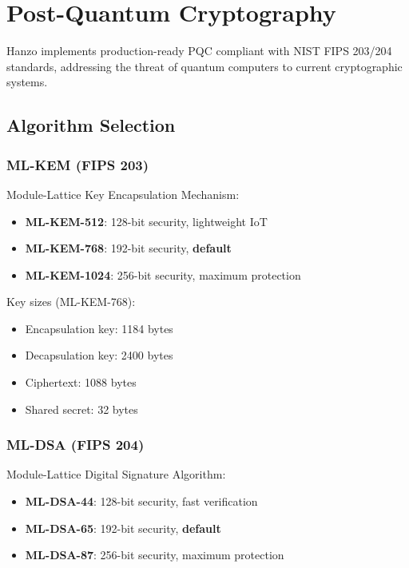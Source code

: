 \section{Post-Quantum Cryptography}


Hanzo implements production-ready PQC compliant with NIST FIPS 203/204 standards, addressing the threat of quantum computers to current cryptographic systems.

\subsection{Algorithm Selection}

\subsubsection{ML-KEM (FIPS 203)}

Module-Lattice Key Encapsulation Mechanism:

\begin{itemize}
\item \textbf{ML-KEM-512}: 128-bit security, lightweight IoT
\item \textbf{ML-KEM-768}: 192-bit security, \textbf{default}
\item \textbf{ML-KEM-1024}: 256-bit security, maximum protection
\end{itemize}

Key sizes (ML-KEM-768):
\begin{itemize}
\item Encapsulation key: 1184 bytes
\item Decapsulation key: 2400 bytes
\item Ciphertext: 1088 bytes
\item Shared secret: 32 bytes
\end{itemize}

\subsubsection{ML-DSA (FIPS 204)}

Module-Lattice Digital Signature Algorithm:

\begin{itemize}
\item \textbf{ML-DSA-44}: 128-bit security, fast verification
\item \textbf{ML-DSA-65}: 192-bit security, \textbf{default}
\item \textbf{ML-DSA-87}: 256-bit security, maximum protection
\end{itemize}

